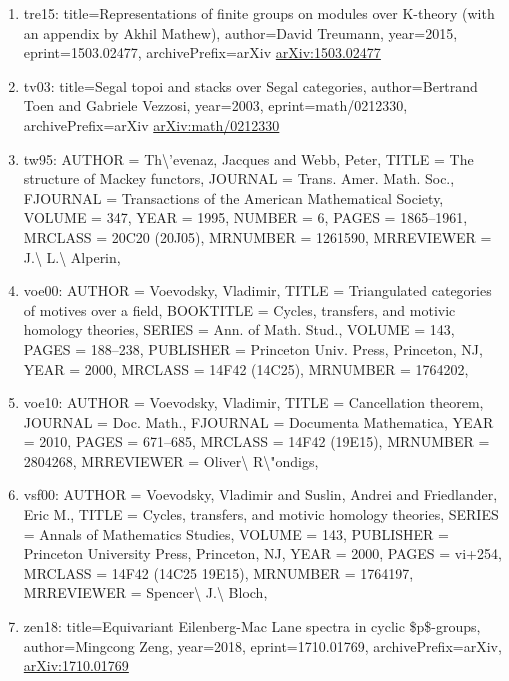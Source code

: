 \documentclass[11pt]{article}
\begin{document}
\begin{enumerate}[leftmargin=*]
  \item tre15: title=Representations of finite groups on modules over K-theory (with an appendix by Akhil Mathew), author=David Treumann, year=2015, eprint=1503.02477, archivePrefix=arXiv \href{https://arxiv.org/abs/1503.02477}{arXiv:1503.02477}
  \item tv03: title=Segal topoi and stacks over Segal categories, author=Bertrand Toen and Gabriele Vezzosi, year=2003, eprint=math/0212330, archivePrefix=arXiv \href{https://arxiv.org/abs/math/0212330}{arXiv:math/0212330}
  \item tw95: AUTHOR = Th\textbackslash{}'evenaz, Jacques and Webb, Peter, TITLE = The structure of Mackey functors, JOURNAL = Trans. Amer. Math. Soc., FJOURNAL = Transactions of the American Mathematical Society, VOLUME = 347, YEAR = 1995, NUMBER = 6, PAGES = 1865--1961, MRCLASS = 20C20 (20J05), MRNUMBER = 1261590, MRREVIEWER = J.\textbackslash{} L.\textbackslash{} Alperin,
  \item voe00: AUTHOR = Voevodsky, Vladimir, TITLE = Triangulated categories of motives over a field, BOOKTITLE = Cycles, transfers, and motivic homology theories, SERIES = Ann. of Math. Stud., VOLUME = 143, PAGES = 188--238, PUBLISHER = Princeton Univ. Press, Princeton, NJ, YEAR = 2000, MRCLASS = 14F42 (14C25), MRNUMBER = 1764202,
  \item voe10: AUTHOR = Voevodsky, Vladimir, TITLE = Cancellation theorem, JOURNAL = Doc. Math., FJOURNAL = Documenta Mathematica, YEAR = 2010, PAGES = 671--685, MRCLASS = 14F42 (19E15), MRNUMBER = 2804268, MRREVIEWER = Oliver\textbackslash{} R\textbackslash{}"ondigs,
  \item vsf00: AUTHOR = Voevodsky, Vladimir and Suslin, Andrei and Friedlander, Eric M., TITLE = Cycles, transfers, and motivic homology theories, SERIES = Annals of Mathematics Studies, VOLUME = 143, PUBLISHER = Princeton University Press, Princeton, NJ, YEAR = 2000, PAGES = vi+254, MRCLASS = 14F42 (14C25 19E15), MRNUMBER = 1764197, MRREVIEWER = Spencer\textbackslash{} J.\textbackslash{} Bloch,
  \item zen18: title=Equivariant Eilenberg-Mac Lane spectra in cyclic \$p\$-groups, author=Mingcong Zeng, year=2018, eprint=1710.01769, archivePrefix=arXiv, \href{https://arxiv.org/abs/1710.01769}{arXiv:1710.01769}
\end{enumerate}

% 
% 
\end{document}
